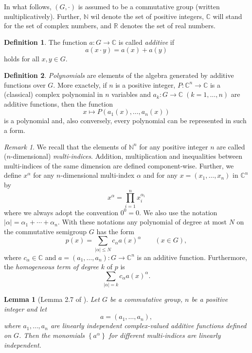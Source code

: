 \documentclass[a4paper,12pt]{article}
\theoremstyle{plain}
\newtheorem{lem}{Lemma}
\theoremstyle{definition}
\newtheorem{dfn}{Definition}
\theoremstyle{remark}
\newtheorem*{rem}{Remark}
\begin{document}
In what follows, $(G, \cdot)$ is assumed to be  a commutative group (written multiplicatively).
Further, $\mathbb{N}$ wil denote the set of positive integers, $\mathbb{C}$ will stand for the set of complex numbers, and $\mathbb{R}$ denotes the set of real numbers. 

\begin{dfn}
 The function $a\colon G\to \mathbb{C}$ is called \emph{additive} if 
 \[
  a(x\cdot y)= a(x)+a(y)
 \]
holds for all $x, y\in G$. 
\end{dfn}



\begin{dfn}
{\it Polynomials} are elements of the algebra generated by additive
functions over $G$. More exactely, if $n$ is a positive integer,
$P\colon\mathbb{C}^{n}\to \mathbb{C}$ is a (classical) complex
polynomial in
 $n$ variables and $a_{k}\colon G\to \mathbb{C}\; (k=1, \ldots, n)$ are additive functions, then the function
 \[
  x\longmapsto P(a_{1}(x), \ldots, a_{n}(x))
 \]
is a polynomial and, also conversely, every polynomial can be
represented in such a form.
\end{dfn}

\begin{rem}
 We recall that the elements of $\mathbb{N}^{n}$ for any positive integer $n$ are called
 ($n$-dimensional) \emph{multi-indices}.
 Addition, multiplication and inequalities between multi-indices of the same dimension are defined component-wise.
 Further, we define $x^{\alpha}$ for any $n$-dimensional multi-index $\alpha$ and for any
 $x=(x_{1}, \ldots, x_{n})$ in $\mathbb{C}^{n}$ by
 \[
  x^{\alpha}=\prod_{i=1}^{n}x_{i}^{\alpha_{i}}
 \]
where we always adopt the convention $0^{0}=0$. We also use the
notation $\left|\alpha\right|= \alpha_{1}+\cdots+\alpha_{n}$. With
these notations any polynomial of degree at most $N$ on the
commutative semigroup $G$ has the form
\[
 p(x)= \sum_{\left|\alpha\right|\leq N}c_{\alpha}a(x)^{\alpha}
 \qquad
 \left(x\in G\right),
\]
where $c_{\alpha}\in \mathbb{C}$ and $a=(a_1, \dots, a_n) \colon
G\to \mathbb{C}^{n}$ is an additive function. Furthermore, the
\emph{homogeneous term of degree $k$} of $p$ is
\[
 \sum_{\left|\alpha\right|=k}c_{\alpha}a(x)^{\alpha} .
\]
\end{rem}


\begin{lem}[Lemma 2.7 of \cite{Sze91}]\label{L_lin_dep}
 Let $G$ be a commutative group,
 $n$ be a positive integer and let
 \[
  a=\left(a_{1}, \ldots, a_{n}\right),
 \]
where $a_{1}, \ldots, a_{n}$ are linearly independent complex-valued
additive functions defined on $G$. Then the monomials
$\left\{a^{\alpha}\right\}$ for different multi-indices are linearly
independent.
\end{lem}
\end{document}
